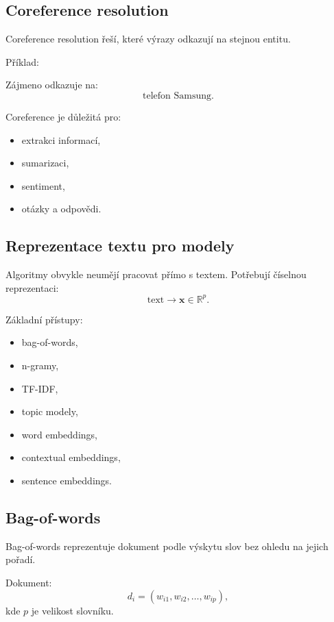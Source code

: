 \subsection{Coreference resolution}

Coreference resolution řeší, které výrazy odkazují na stejnou entitu.

Příklad:
\begin{quote}
\end{quote}

Zájmeno  odkazuje na:
\[
\text{telefon Samsung}.
\]

Coreference je důležitá pro:
\begin{itemize}
    \item extrakci informací,
    \item sumarizaci,
    \item sentiment,
    \item otázky a odpovědi.
\end{itemize}

\subsection{Reprezentace textu pro modely}

Algoritmy obvykle neumějí pracovat přímo s textem. Potřebují číselnou reprezentaci:
\[
\text{text}
\rightarrow
\mathbf{x}\in\mathbb{R}^p.
\]

Základní přístupy:
\begin{itemize}
    \item bag-of-words,
    \item n-gramy,
    \item TF-IDF,
    \item topic modely,
    \item word embeddings,
    \item contextual embeddings,
    \item sentence embeddings.
\end{itemize}

\subsection{Bag-of-words}

Bag-of-words reprezentuje dokument podle výskytu slov bez ohledu na jejich pořadí.

Dokument:
\[
d_i=(w_{i1},w_{i2},\ldots,w_{ip}),
\]
kde $p$ je velikost slovníku.

